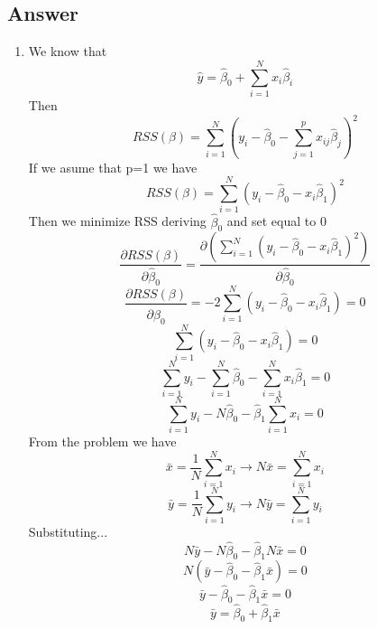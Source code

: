 \documentclass[conference, onecolumn]{IEEEtran}
\begin{document}
	\subsection*{Answer}
	\begin{enumerate}
		\item[(a)] We know that \begin{equation}
			\hat{y} = \hat{\beta}_0 + \sum_{i=1}^{N} x_i \hat{\beta}_i
		\end{equation}
		Then \begin{equation}
			RSS(\beta) = \sum_{i=1}^{N} \left( y_i - \hat{\beta}_0 - \sum_{j=1}^{p} x_{ij} \hat{\beta}_j \right)^2
		\end{equation}
		If we asume that p=1 we have \begin{equation}
			RSS(\beta) = \sum_{i=1}^{N} (y_i - \hat{\beta}_0 - x_i \hat{\beta}_1)^2
		\end{equation}
		Then we minimize RSS deriving $\hat{\beta}_0$ and set equal to 0
		\begin{equation}
		\frac{\partial RSS(\beta)}{\partial \hat{\beta}_0} = \frac{\partial (\sum_{i=1}^{N} (y_i - \hat{\beta}_0 - x_i \hat{\beta}_1)^2)}{\partial \hat{\beta}_0}
		\end{equation}
		\begin{equation}
			\frac{\partial RSS(\beta)}{\partial \hat{\beta}_0} = -2 \sum_{i=1}^{N} (y_i - \hat{\beta}_0 - x_i \hat{\beta}_1) = 0
		\end{equation}
		\begin{equation}
			\sum_{i=1}^{N} (y_i - \hat{\beta}_0 - x_i \hat{\beta}_1) = 0
		\end{equation}
		\begin{equation}
			\sum_{i=1}^{N} y_i - \sum_{i=1}^{N} \hat{\beta}_0 - \sum_{i=1}^{N} x_i \hat{\beta}_1 = 0
		\end{equation}
		\begin{equation}
			\sum_{i=1}^{N} y_i - N \hat{\beta}_0 - \hat{\beta}_1 \sum_{i=1}^{N} x_i = 0
		\end{equation}
		From the problem we have
		\begin{equation}
			\bar{x} = \frac{1}{N} \sum_{i=1}^{N} x_i \rightarrow N\bar{x} = \sum_{i=1}^{N} x_i
		\end{equation}
		\begin{equation}
			\bar{y} = \frac{1}{N} \sum_{i=1}^{N} y_i \rightarrow N\bar{y} = \sum_{i=1}^{N} y_i
		\end{equation}
		Substituting...
		\begin{equation}
			N\bar{y} - N\hat{\beta}_0 - \hat{\beta}_1 N\bar{x} = 0
		\end{equation}
		\begin{equation}
			N(\bar{y} - \hat{\beta}_0 - \hat{\beta}_1 \bar{x}) = 0
		\end{equation}
		\begin{equation}
			\bar{y} - \hat{\beta}_0 - \hat{\beta}_1 \bar{x} = 0
		\end{equation}
		\begin{equation}
			\bar{y} = \hat{\beta}_0 + \hat{\beta}_1 \bar{x}
		\end{equation}
		

\end{enumerate}
\end{document}
